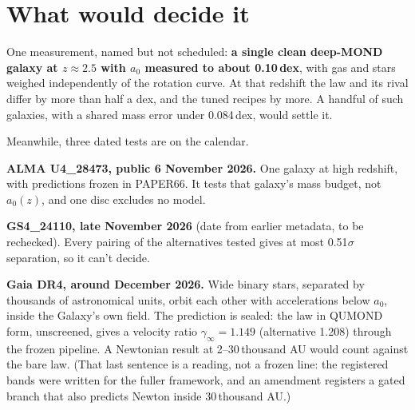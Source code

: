 \section{What would decide it}

One measurement, named but not scheduled: \textbf{a single clean deep-MOND galaxy at $z\approx2.5$ with $a_0$ measured to about 0.10\,dex}, with gas and stars weighed independently of the rotation curve. At that redshift the law and its rival differ by more than half a dex, and the tuned recipes by more. A handful of such galaxies, with a shared mass error under 0.084\,dex, would settle it.




Meanwhile, three dated tests are on the calendar.


\textbf{ALMA U4\_28473, public 6 November 2026.} One galaxy at high redshift, with predictions frozen in PAPER66. It tests that galaxy's mass budget, not $a_0(z)$, and one disc excludes no model.

\textbf{GS4\_24110, late November 2026} (date from earlier metadata, to be rechecked). Every pairing of the alternatives tested gives at most 0.51$\sigma$ separation, so it can't decide.

\textbf{Gaia DR4, around December 2026.} Wide binary stars, separated by thousands of astronomical units, orbit each other with accelerations below $a_0$, inside the Galaxy's own field. The prediction is sealed: the law in QUMOND form, unscreened, gives a velocity ratio $\gamma_\infty=1.149$ (alternative 1.208) through the frozen pipeline. A Newtonian result at 2--30\,thousand AU would count against the bare law. (That last sentence is a reading, not a frozen line: the registered bands were written for the fuller framework, and an amendment registers a gated branch that also predicts Newton inside 30\,thousand AU.)


